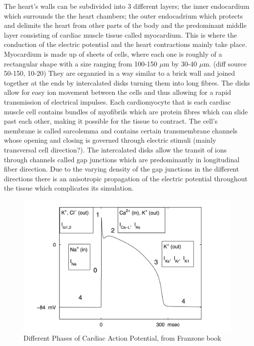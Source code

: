 \documentclass[fleqn, a4paper, 11pt, bibliography=totoc]{report}
\begin{document}
The heart's walls can be subdivided into 3 different layers; the inner endocardium which surrounds the the heart chambers; the outer endocadrium which protects and delimits the heart from other parts of the body and the predominant middle layer consisting of cardiac muscle tissue called myocardium. This is where the conduction of the electric potential and the heart contractions mainly take place. Myocardium is made up of sheets of cells, where each one is roughly of a rectangular shape with a size ranging from 100-150 $\mu$m by 30-40 $\mu$m. (diff source 50-150, 10-20) They are organzied in a way similar to a brick wall and joined together at the ends by intercalated disks turning them into long fibres. The disks allow for easy ion movement between the cells and thus allowing for a rapid transmission of electrical impulses. Each cardiomyocyte that is each cardiac muscle cell contains bundles of myofibrils which are protein fibres which can slide past each other, making it possible for the tissue to contract. The cell's membrane is called sarcolemma and contains certain transmembrane channels whose opening and closing is governed through electric stimuli (mainly transversal cell direction?). The intercalated disks allow the transit of ions through channels called gap junctions which are predominantly in longitudinal fiber direction. Due to the varying density of the gap junctions in the different directions there is an anisotropic propagation of the electric potential throughout the tissue which complicates its simulation. 

\begin{figure}[ht!]
	\centering
	\includegraphics[scale=0.3]{images/cardiac_action_pot_franzone}
	\caption{Different Phases of Cardiac Action Potential, from Franzone book}
\end{figure}
\end{document}
